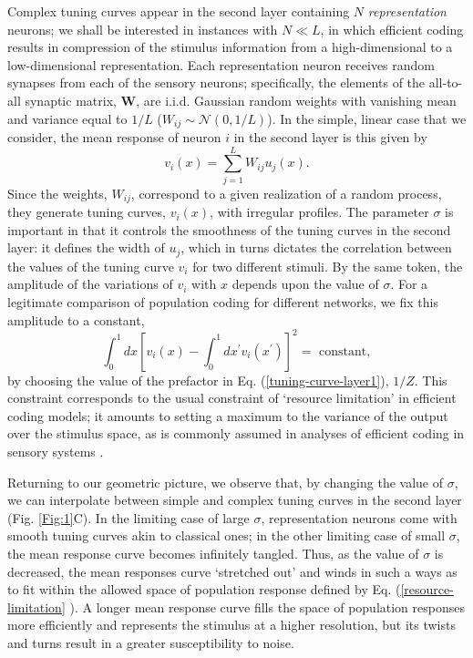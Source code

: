 \documentclass[a4paper]{article}%
\begin{document}
Complex tuning curves appear in the second layer containing $N$
\textit{representation} neurons; we shall be interested in instances with $N\ll L$,
in which efficient coding results in compression of the stimulus information
from a high-dimensional to a low-dimensional representation. Each
representation neuron receives random synapses from each of the sensory
neurons; specifically, the elements of the all-to-all synaptic matrix,
$\mathbf{W}$, are i.i.d. Gaussian random weights with vanishing mean and
variance equal to $1/L$ ($W_{ij}\sim\mathcal{N}\left(  0,1/L\right)  $). In
the simple, linear case that we consider, the mean response of neuron $i$ in
the second layer is this given by
\begin{equation}
v_{i}\left(  x\right)  =\sum_{j=1}^{L}W_{ij}u_{j}\left(  x\right)  .
\end{equation}
Since the weights, $W_{ij}$, correspond to a given realization of a random
process, they generate tuning curves, $v_{i}\left(  x\right)  $, with
irregular profiles. The parameter $\sigma$ is important in that it controls
the smoothness of the tuning curves in the second layer: it defines the width
of $u_{j}$, which in turns dictates the correlation between the values of the
tuning curve $v_{i}$ for two different stimuli. By the same token, the
amplitude of the variations of $v_{i}$ with $x$ depends upon the value of
$\sigma$. For a legitimate comparison of population coding for different
networks, we fix this amplitude to a constant,
\begin{equation}
\int_{0}^{1}dx\left[  v_{i}\left(  x\right)  -\int_{0}^{1}dx^{\prime} v_{i}\left(  x^{\prime}\right)  \right]  ^{2}=\text{ constant}
,\label{resource-limitation}
\end{equation}
by choosing the value of the prefactor in Eq. (\ref{tuning-curve-layer1}),
$1/Z$. This constraint corresponds to the usual constraint of `resource
limitation' in efficient coding models; it amounts to setting a maximum to the variance of the output over the
stimulus space, as is commonly assumed in analyses of efficient coding in
sensory systems \cite[]{Doi2012EfficientRetina,Zhaoping2014UnderstandingData}.

Returning to our geometric picture, we observe that, by changing the value of
$\sigma$, we can interpolate between simple and complex tuning curves in the
second layer (Fig. \ref{Fig:1}C). In the limiting case of large $\sigma$,
representation neurons come with smooth tuning curves akin to classical ones;
in the other limiting case of small $\sigma$, the mean response curve becomes
infinitely tangled. Thus, as the value of $\sigma$ is decreased, the mean
responses curve `stretched out' and winds in such a ways as to fit within the
allowed space of population response defined by Eq. (\ref{resource-limitation}
). A longer mean response curve fills the space of population responses more
efficiently and represents the stimulus at a higher resolution, but its twists
and turns result in a greater susceptibility to noise.
\end{document}
